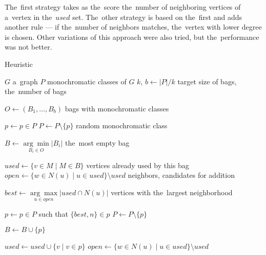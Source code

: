 The~first strategy \Neighbors{} takes as the~score the~number of
neighboring vertices of a~vertex in the~$used$ set.
The~other strategy \NeighborsDegree{} is based
on the~first and adds another rule ---
if the~number of neighbors matches, the~vertex with lower degree is chosen.
%
Other variations of this approach were also tried,
but the~performance was not better.


\begin{algorithm}[ht]
	\caption{Heuristic \Neighbors}%
	\label{alg:neighbors}
	\begin{algorithmic}[1]

		\Require{} $G$
		\Comment{} a~graph
		\Require{} $P$
		\Comment{} monochromatic classes of $G$
		\Require{} $k$, $b \gets |P|/k$
		\Comment{} target size of bags, the~number of bags

		\Ensure{} $O \gets (B_1, \ldots, B_b)$
		\Comment{} bags with monochromatic classes

		\State{} $p \gets p \in P$
		\State{} $P \gets P \setminus \{p\}$
		\Comment{} random monochromatic class

		\State{} $B \gets \underset{B_i \in O}{\arg\min} |B_i|$
		\Comment{} the~most empty bag

		\State{} $used \gets \{{v \in M} \mid {M \in B } \}$
		\Comment{} vertices already used by this bag
		\State{} $open \gets  \{w \in N(u) \mid u \in used\} \setminus used $
		\Comment{} neighbors, candidates for addition


		\State{} $best \gets \underset{u \in open}{\arg\max}|used \cap N(u)|$
		\Comment{} vertices with the~largest neighborhood

		\State{} $p \gets p \in P$ such that $\{best, n\} \in p$
		\State{} $P \gets P \setminus \{p\}$

		\State{} $B \gets B \cup \{p\}$

		\State{} $used \gets used \cup \{v \mid {v \in p} \}$
		\State{} $open \gets  \{w \in N(u) \mid u \in used\} \setminus used $
		\EndFor{}
		\EndWhile{}
		\EndWhile{}
	\end{algorithmic}
\end{algorithm}

\subsubsection*{\CyclesMatchChunks{}}

